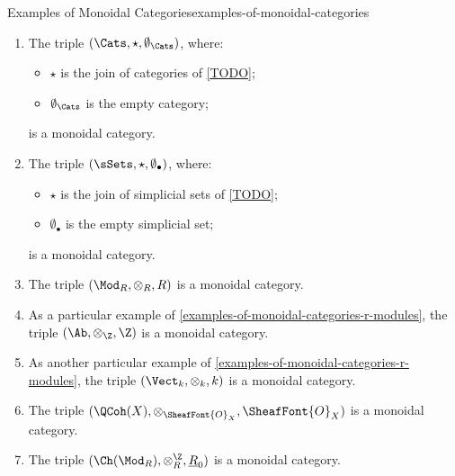 \begin{example}{Examples of Monoidal Categories}{examples-of-monoidal-categories}
\begin{enumerate}
\begin{itemize}
                \item $\Cats$     (\cref{TODO}).
                \item $\Grpd$     (\cref{TODO}).
                \item $\Sch_{/S}$ (\cref{TODO}).
            \end{itemize}
        \item\label{examples-of-monoidal-categories-categories-and-joins}The triple $(\Cats,\star,\emptyset_{\Cats})$, where:
            \begin{itemize}
                \item $\star$ is the join of categories of \cref{TODO};
                \item $\emptyset_{\Cats}$ is the empty category;
            \end{itemize}
            is a monoidal category.
        \item\label{examples-of-monoidal-categories-simplicial-sets}The triple $(\sSets,\star,\emptyset_{\bullet})$, where:
            \begin{itemize}
                \item $\star$ is the join of simplicial sets of \cref{TODO};
                \item $\emptyset_{\bullet}$ is the empty simplicial set;
            \end{itemize}
            is a monoidal category.
        \item\label{examples-of-monoidal-categories-r-modules}The triple $(\Mod_{R},\otimes_{R},R)$ is a monoidal category.
        \item\label{examples-of-monoidal-categories-abelian-groups}As a particular example of \cref{examples-of-monoidal-categories-r-modules}, the triple $(\Ab,\otimes_{\Z},\Z)$ is a monoidal category.
        \item\label{examples-of-monoidal-categories-vector-spaces}As another particular example of \cref{examples-of-monoidal-categories-r-modules}, the triple $(\Vect_{k},\otimes_{k},k)$ is a monoidal category.
        \item\label{examples-of-monoidal-categories-quasicoherent-sheaves}The triple $(\QCoh(X),\otimes_{\SheafFont{O}_{X}},\SheafFont{O}_{X})$ is a monoidal category.
        \item\label{examples-of-monoidal-categories-chain-complexes}The triple $(\Ch(\Mod_{R}),\otimes^{\Z}_{R},\underline{R}_{0})$ is a monoidal category.
    \end{enumerate}
\end{example}
